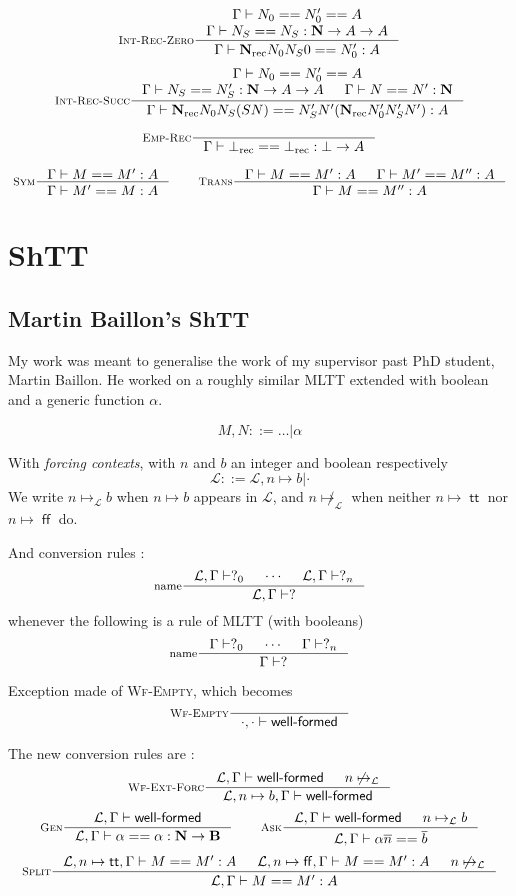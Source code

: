 \documentclass[11pt]{article}
\DeclareMathOperator{\rec}{rec}
\DeclareMathOperator{\true}{\mathsf{tt}}
\DeclareMathOperator{\false}{\mathsf{ff}}
\newcommand{\ovl}{\overline}
\newcommand{\0}{\mathbf{0}}
\newcommand{\1}{\mathbf{1}}
\newcommand{\nat}{\mathbf{N}}
\newcommand{\bool}{\mathbf{B}}
\newcommand{\tctx}{\Gamma}
\newcommand{\Wf}{\textsf{well-formed}}
\newcommand{\fctx}{\mathcal{L}}
\begin{document}
$$
    \inference[\textsc{Int-Rec-Zero}]{\tctx |- N_0 == N'_0 == A\\ \tctx |- N_S == N_S : \nat -> A  -> A}{\tctx |- \nat_{\rec} N_0N_S0 == N'_0 : A}
$$
$$
    \inference[\textsc{Int-Rec-Succ}]{\tctx |- N_0 == N'_0 == A\\ \tctx |- N_S == N'_S : \nat -> A  -> A & \tctx |- N == N' :\nat}{\tctx |- \nat_{\rec} N_0N_S (S N) == N'_S N' (\nat_{\rec}N'_0 N'_S N') : A}
$$


$$
    \inference[\textsc{Emp-Rec}]{}{\tctx |- \bot_{\rec} == \bot_{\rec} : \bot -> A}
$$

$$
    \inference[\textsc{Sym}]{\tctx |- M == M' : A}{\tctx |- M' == M : A} \qquad
    \inference[\textsc{Trans}]
    {\tctx |- M == M' :A & \tctx |- M' == M'' : A}{\tctx |- M == M'' : A}
$$

\section{ShTT}
\subsection{Martin Baillon's ShTT}\label{MBshtt}
My work was meant to generalise the work of my supervisor past PhD student, Martin Baillon. He worked on a roughly similar MLTT extended with boolean and a generic function $\alpha$.

$$ M, N ::= \dots |\alpha$$

With \emph{forcing contexts}, with $n$ and $b$ an integer and boolean respectively
$$ \fctx ::= \fctx, n \mapsto b | \cdot$$
We write $n\mapsto_\fctx b$ when $n\mapsto b$ appears in $\fctx$, and $n\not\mapsto_\fctx$ when neither $n\mapsto \true$ nor $n\mapsto \false$ do.

And conversion rules :
$$
    \inference[name]{\fctx,\tctx |- ?_0 & \cdots & \fctx,\tctx |- ?_n}{\fctx,\tctx |- ?}
$$
whenever the following is a rule of MLTT (with booleans)
$$
    \inference[name]{\tctx |- ?_0 & \cdots & \tctx |- ?_n}{\tctx |- ?}
$$

Exception made of \textsc{Wf-Empty}, which becomes
$$
    \inference[\textsc{Wf-Empty}]{}{\cdot,\cdot |- \Wf}
$$

The new conversion rules are :
$$
    \inference[\textsc{Wf-Ext-Forc}]{\fctx,\tctx |- \Wf & n\not\mapsto_\fctx}{\fctx, n\mapsto b, \tctx |- \Wf}
$$
$$
    \inference[\textsc{Gen}]{\fctx,\tctx|- \Wf}{\fctx,\tctx |- \alpha == \alpha : \nat -> \bool}
    \qquad
    \inference[\textsc{Ask}]{\fctx,\tctx|- \Wf &n\mapsto_\fctx b}{\fctx, \tctx |- \alpha \ovl n == \ovl b}
$$
$$
    \inference[\textsc{Split}]{\fctx,n\mapsto \true,\tctx |-M == M' :A & \fctx, n\mapsto\false, \tctx |- M == M' : A & n\not\mapsto_\fctx}{\fctx,\tctx |- M == M' : A}
$$
\end{document}
